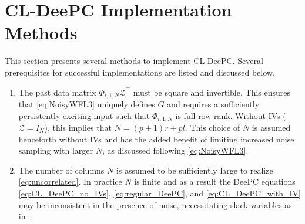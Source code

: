 \section{\acs{CL-DeePC} Implementation Methods}\label{sec:SolutionMethods}
This section presents several methods to implement \ac{CL-DeePC}. Several prerequisites for successful implementations are listed and discussed below.
\begin{enumerate}
    \item The past data matrix $\Phi_{i,1,N}\mathcal{Z}^\top$ must be square and invertible. This ensures that \eqref{eq:NoisyWFL3} uniquely defines $G$ and requires a sufficiently persistently exciting input such that $\Phi_{i,1,N}$ is full row rank. Without \ac{IVs} ($\mathcal{Z}=I_N$), this implies that $N=(p+1)r+pl$. This choice of $N$ is assumed henceforth without \ac{IVs} and has the added benefit of limiting increased noise sampling with larger $N$, as discussed following \eqref{eq:NoisyWFL3}.
    \item The number of columns $N$ is assumed to be sufficiently large to realize \eqref{eq:uncorrelated}. In practice $N$ is finite and as a result the \ac{DeePC} equations \eqref{eq:CL_DeePC_no_IVs}, \eqref{eq:regular_DeePC}, and \eqref{eq:CL_DeePC_with_IV} may be inconsistent in the presence of noise, necessitating slack variables as in~\cite{Coulson2019}.
\end{enumerate}
% 
%
